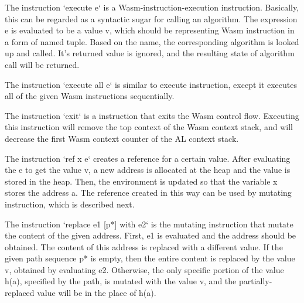 The instruction `execute e` is a Wasm-instruction-execution instruction. Basically, this can be
regarded as a syntactic sugar for calling an algorithm. The expression e is evaluated to be
a value v, which should be representing Wasm instruction in a form of named tuple.
Based on the name, the corresponding algorithm is looked up and called. It's returned value is
ignored, and the resulting state of algorithm call will be returned.

The instruction `execute all e` is similar to execute instruction,
except it executes all of the given Wasm instructions sequentially.

The instruction `exit` is a instruction that exits the Wasm control flow.
Executing this instruction will remove the top context of the Wasm context stack,
and will decrease the first Wasm context counter of the AL context stack.

The instruction `ref x e` creates a reference for a certain value.
After evaluating the e to get the value v, a new address is allocated at the heap and
the value is stored in the heap. Then, the environment is updated so that the
variable x stores the address a. The reference created in this way can be
used by mutating instruction, which is described next.

The instruction `replace e1 [p*] with e2` is the mutating instruction that
mutate the content of the given address. First, e1 is evaluated and the
address should be obtained. The content of this address is replaced with
a different value. If the given path sequence p* is empty, then the entire content
is replaced by the value v, obtained by evaluating e2. Otherwise, the only
specific portion of the value h(a), specified by the path, is mutated with the
value v, and the partially-replaced value will be in the place of h(a).

